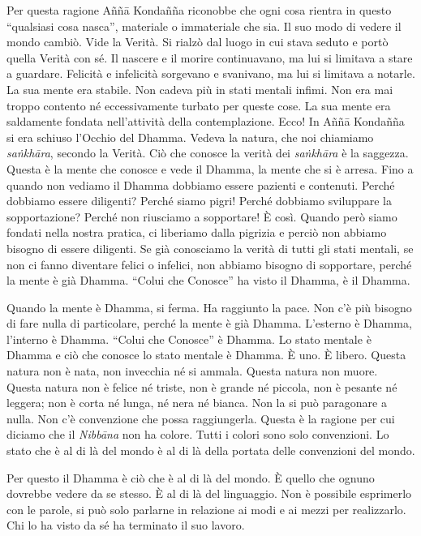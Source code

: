Per questa ragione Aññā Kondañña riconobbe che ogni cosa rientra in
questo ``qualsiasi cosa nasca'', materiale o immateriale che sia. Il suo
modo di vedere il mondo cambiò. Vide la Verità. Si rialzò dal luogo in
cui stava seduto e portò quella Verità con sé. Il nascere e il morire
continuavano, ma lui si limitava a stare a guardare. Felicità e
infelicità sorgevano e svanivano, ma lui si limitava a notarle. La sua
mente era stabile. Non cadeva più in stati mentali infimi. Non era mai
troppo contento né eccessivamente turbato per queste cose. La sua mente
era saldamente fondata nell'attività della contemplazione. Ecco! In Aññā
Kondañña si era schiuso l'Occhio del Dhamma. Vedeva la natura, che noi
chiamiamo \emph{saṅkhāra}, secondo la Verità. Ciò che conosce la verità
dei \emph{saṅkhāra} è la saggezza. Questa è la mente che conosce e vede
il Dhamma, la mente che si è arresa. Fino a quando non vediamo il Dhamma
dobbiamo essere pazienti e contenuti. Perché dobbiamo essere diligenti?
Perché siamo pigri! Perché dobbiamo sviluppare la sopportazione? Perché
non riusciamo a sopportare! È così. Quando però siamo fondati nella
nostra pratica, ci liberiamo dalla pigrizia e perciò non abbiamo bisogno
di essere diligenti. Se già conosciamo la verità di tutti gli stati
mentali, se non ci fanno diventare felici o infelici, non abbiamo
bisogno di sopportare, perché la mente è già Dhamma. ``Colui che
Conosce'' ha visto il Dhamma, è il Dhamma.

Quando la mente è Dhamma, si ferma. Ha raggiunto la pace. Non c'è più
bisogno di fare nulla di particolare, perché la mente è già Dhamma.
L'esterno è Dhamma, l'interno è Dhamma. ``Colui che Conosce'' è Dhamma.
Lo stato mentale è Dhamma e ciò che conosce lo stato mentale è Dhamma. È
uno. È libero. Questa natura non è nata, non invecchia né si ammala.
Questa natura non muore. Questa natura non è felice né triste, non è
grande né piccola, non è pesante né leggera; non è corta né lunga, né
nera né bianca. Non la si può paragonare a nulla. Non c'è convenzione
che possa raggiungerla. Questa è la ragione per cui diciamo che il
\emph{Nibbāna} non ha colore. Tutti i colori sono solo convenzioni. Lo
stato che è al di là del mondo è al di là della portata delle
convenzioni del mondo.

Per questo il Dhamma è ciò che è al di là del mondo. È quello che ognuno
dovrebbe vedere da se stesso. È al di là del linguaggio. Non è possibile
esprimerlo con le parole, si può solo parlarne in relazione ai modi e ai
mezzi per realizzarlo. Chi lo ha visto da sé ha terminato il suo lavoro.

